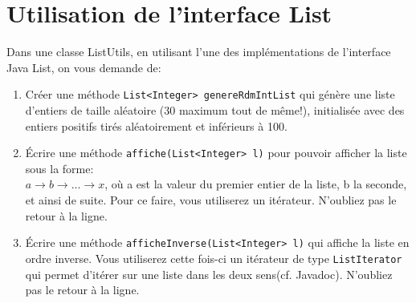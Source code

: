 \documentclass[iutinfo,a4paper,nocorrections,10pt]{ustl-tdtp}
\date{\annee{2017}--\annee{2018}}
\begin{document}
\maketitle
\thispagestyle{empty}


\sloppy
\section{Utilisation de l'interface List}

Dans une classe ListUtils, en utilisant l'une des implémentations de l'interface Java List, on vous demande de:
\begin{enumerate}
\item Créer une méthode \texttt{List<Integer> genereRdmIntList} qui génère une liste d'entiers de taille aléatoire (30 maximum tout de même!), initialisée avec des entiers positifs tirés aléatoirement et inférieurs à 100.

\item Écrire une méthode \texttt{affiche(List<Integer> l)} pour pouvoir afficher la liste sous la forme:\\
$a \rightarrow b \rightarrow ...\rightarrow x$, où a est la valeur du premier entier de la liste, b la seconde, et ainsi de suite. Pour ce faire, vous utiliserez un itérateur. N'oubliez pas le retour à la ligne.

\item Écrire une méthode \texttt{afficheInverse(List<Integer> l)} qui affiche la liste en ordre inverse. Vous utiliserez cette fois-ci un itérateur de type \texttt{ListIterator} qui permet d'itérer sur une liste dans les deux sens(cf. Javadoc). N'oubliez pas le retour à la ligne.


\end{enumerate}
\end{document}
